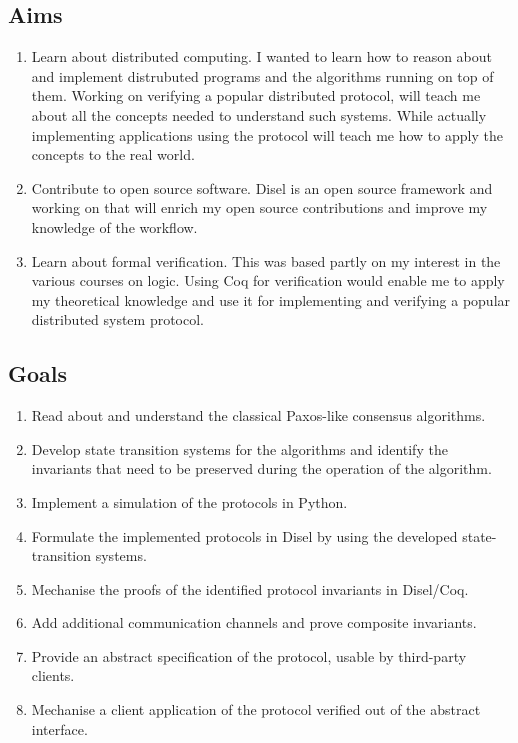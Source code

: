 \subsection{Aims}
\begin{enumerate}
\itemsep0em
  \item Learn about distributed computing. I wanted to learn how to reason about
    and implement distrubuted programs and the algorithms running on top of them.
    Working on verifying a popular distributed protocol, will teach me about all
    the concepts needed to understand such systems. While actually implementing
    applications using the protocol will teach me how to apply the concepts to
    the real world.
  \item Contribute to open source software. Disel is an open source framework
    and working on that will enrich my open source contributions and improve
    my knowledge of the workflow.
  \item Learn about formal verification. This was based partly on my interest in
    the various courses on logic. Using Coq for verification would enable me
    to apply my theoretical knowledge and use it for
    implementing and verifying a popular distributed system protocol.

\end{enumerate}

\vspace{-5mm}
\subsection{Goals}
\begin{enumerate}
\itemsep0em
  \item Read about and understand the classical Paxos-like consensus algorithms.
  \item Develop state transition systems for the algorithms and identify the invariants that need to be preserved during the operation of the algorithm.
  \item Implement a simulation of the protocols in Python.
  \item Formulate the implemented protocols in Disel by using the developed state-transition systems.
  \item Mechanise the proofs of the identified protocol invariants in Disel/Coq.
  \item Add additional communication channels and prove composite invariants.
  \item Provide an abstract specification of the protocol, usable by third-party clients.
  \item Mechanise a client application of the protocol verified out of the abstract interface.
\end{enumerate}

